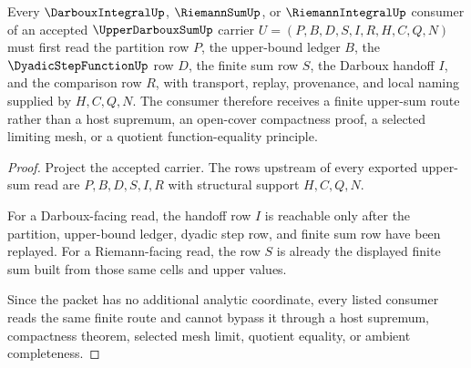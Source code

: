 \begin{theorem}\label{thm:upper-darboux-sum-consumer-boundary}
Every $\DarbouxIntegralUp$, $\RiemannSumUp$, or $\RiemannIntegralUp$ consumer of an accepted $\UpperDarbouxSumUp$ carrier $U=(P,B,D,S,I,R,H,C,Q,N)$ must first read the partition row $P$, the upper-bound ledger $B$, the $\DyadicStepFunctionUp$ row $D$, the finite sum row $S$, the Darboux handoff $I$, and the comparison row $R$, with transport, replay, provenance, and local naming supplied by $H,C,Q,N$. The consumer therefore receives a finite upper-sum route rather than a host supremum, an open-cover compactness proof, a selected limiting mesh, or a quotient function-equality principle.
\end{theorem}
\begin{proof}
Project the accepted carrier. The rows upstream of every exported upper-sum read are $P,B,D,S,I,R$ with structural support $H,C,Q,N$.

For a Darboux-facing read, the handoff row $I$ is reachable only after the partition, upper-bound ledger, dyadic step row, and finite sum row have been replayed. For a Riemann-facing read, the row $S$ is already the displayed finite sum built from those same cells and upper values.

Since the packet has no additional analytic coordinate, every listed consumer reads the same finite route and cannot bypass it through a host supremum, compactness theorem, selected mesh limit, quotient equality, or ambient completeness.
\end{proof}


